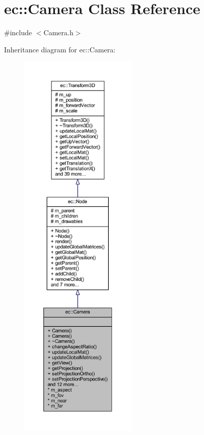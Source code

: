 \hypertarget{classec_1_1_camera}{}\section{ec\+:\+:Camera Class Reference}
\label{classec_1_1_camera}


{\ttfamily \#include $<$Camera.\+h$>$}



Inheritance diagram for ec\+:\+:Camera\+:\nopagebreak
\begin{figure}[H]
\begin{center}
\leavevmode
\includegraphics[height=550pt]{classec_1_1_camera__inherit__graph}
\end{center}
\end{figure}


